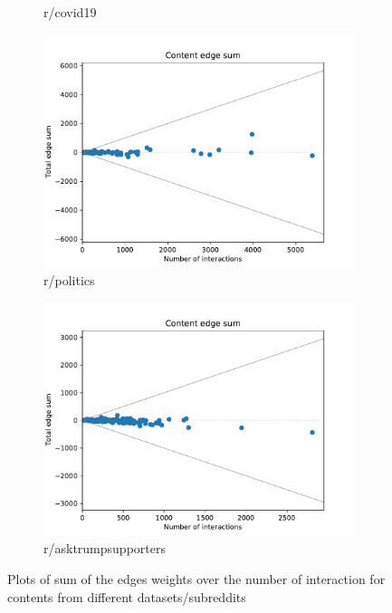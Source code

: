 \begin{figure}
\begin{center}
\begin{subfigure}[b]{0.4\textwidth}
			\caption{r/covid19}
			\label{fig:tex/out/covid19200/edge-sum-n-interactions.pdf}
		\end{subfigure}
		\begin{subfigure}[b]{0.4\textwidth}
			\centering
			\includegraphics[width=\textwidth]{tex/out/politics200/edge-sum-n-interactions.pdf}
			\caption{r/politics}
			\label{fig:tex/out/cats200/edge-sum-n-interactions.pdf}
		\end{subfigure}
		\begin{subfigure}[b]{0.4\textwidth}
			\centering
			\includegraphics[width=\textwidth]{tex/out/asktrumpsupporters200/edge-sum-n-interactions.pdf}
			\caption{r/asktrumpsupporters}
			\label{fig:tex/out/covid19200/edge-sum-n-interactions.pdf}
		\end{subfigure}
	\end{center}
	\caption[Sum edges over number of interactions for many datasets]{Plots of
		sum of the edges weights over the number of interaction for contents
		from different datasets/subreddits}
	\label{fig:edge-sum-n-interactions}
\end{figure}

